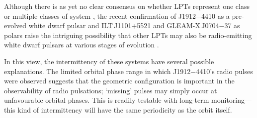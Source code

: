 \documentclass[fleqn,usenatbib]{mnras}
\newcommand{\todo}[1]{{\color{red}#1}}
\begin{document}


Although there is as yet no clear consensus on whether LPTs represent one class or multiple classes of system \citep[e.g.][]{2024ApJ...961..214R}, the recent confirmation of J1912$-$4410 as a pre-evolved white dwarf pulsar \citep{2023NatAs...7..931P} and ILT\,J1101+5521 and GLEAM-X\,J0704$-$37 as polars \citep{deRuiter2025,2025A&A...695L...8R} raise the intriguing possibility that other LPTs may also be radio-emitting white dwarf pulsars at various stages of evolution \citep{2021NatAs...5..648S}.

In this view, the intermittency of these systems have several possible explanations.
The limited orbital phase range in which J1912$-$4410's radio pulses were observed suggests that the geometric configuration is important in the observability of radio pulsations; `missing' pulses may simply occur at unfavourable orbital phases.
This is readily testable with long-term monitoring---this kind of intermittency will have the same periodicity as the orbit itself.
\end{document}
